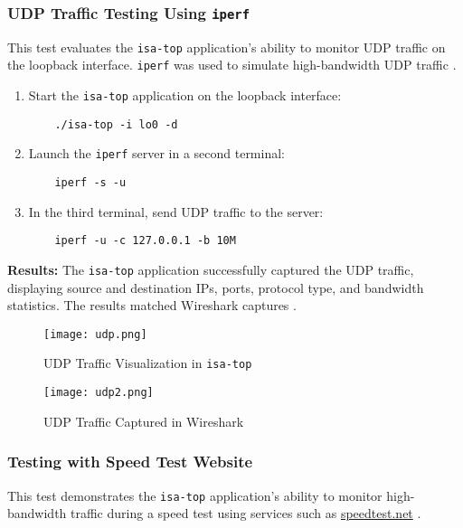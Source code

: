 \documentclass[12pt]{extarticle}
\begin{document}
\subsubsection{UDP Traffic Testing Using \texttt{iperf}}

This test evaluates the \texttt{isa-top} application’s ability to monitor UDP traffic on the loopback interface. \texttt{iperf} was used to simulate high-bandwidth UDP traffic \cite{iperf}.

\begin{enumerate}
    \item Start the \texttt{isa-top} application on the loopback interface:
    \begin{verbatim}
    ./isa-top -i lo0 -d
    \end{verbatim}
    \item Launch the \texttt{iperf} server in a second terminal:
    \begin{verbatim}
    iperf -s -u
    \end{verbatim}
    \item In the third terminal, send UDP traffic to the server:
    \begin{verbatim}
    iperf -u -c 127.0.0.1 -b 10M
    \end{verbatim}
\end{enumerate}

\textbf{Results:} The \texttt{isa-top} application successfully captured the UDP traffic, displaying source and destination IPs, ports, protocol type, and bandwidth statistics. The results matched Wireshark captures \cite{libpcap}.

\begin{figure}[H]
    \centering
    \texttt{[image: udp.png]}
    \caption{UDP Traffic Visualization in \texttt{isa-top}}
\end{figure}

\begin{figure}[H]
    \centering
    \texttt{[image: udp2.png]}
    \caption{UDP Traffic Captured in Wireshark}
\end{figure}

\subsubsection{Testing with Speed Test Website}

This test demonstrates the \texttt{isa-top} application’s ability to monitor high-bandwidth traffic during a speed test using services such as \href{https://www.speedtest.net}{speedtest.net} \cite{speedtest}.
\end{document}
